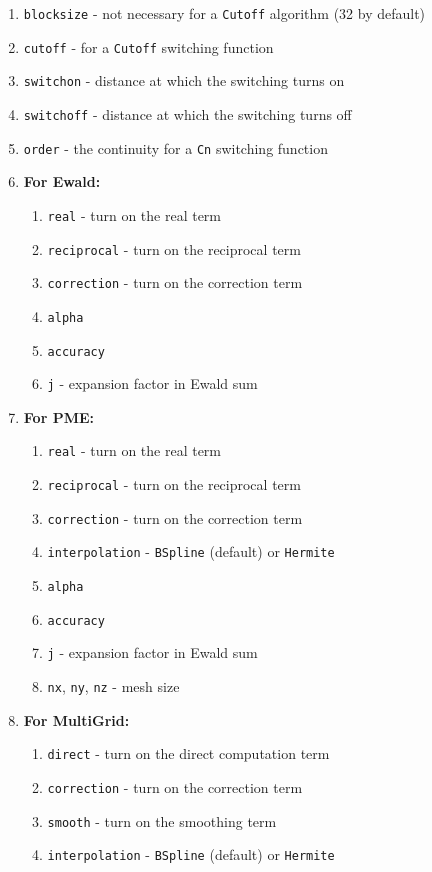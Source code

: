 \documentclass[11pt]{report}
\begin{document}
\begin{enumerate}
\item \texttt{blocksize} - not necessary for a \texttt{Cutoff} algorithm (32 by default)
\item \texttt{cutoff} - for a \texttt{Cutoff} switching function
\item \texttt{switchon} - distance at which the switching turns on
\item \texttt{switchoff} - distance at which the switching turns off
\item \texttt{order} - the continuity for a \texttt{Cn} switching function
\item {\bf For Ewald:}
\begin{enumerate}
\item \texttt{real} - turn on the real term
\item \texttt{reciprocal} - turn on the reciprocal term
\item \texttt{correction} - turn on the correction term
\item \texttt{alpha}
\item \texttt{accuracy}
\item \texttt{j} - expansion factor in Ewald sum
\end{enumerate}
\item {\bf For PME:}
\begin{enumerate}
\item \texttt{real} - turn on the real term
\item \texttt{reciprocal} - turn on the reciprocal term
\item \texttt{correction} - turn on the correction term
\item \texttt{interpolation} - \texttt{BSpline} (default) or \texttt{Hermite}
\item \texttt{alpha}
\item \texttt{accuracy}
\item \texttt{j} - expansion factor in Ewald sum
\item \texttt{nx}, \texttt{ny}, \texttt{nz} - mesh size
\end{enumerate}
\item {\bf For MultiGrid:}
\begin{enumerate}
\item \texttt{direct} - turn on the direct computation term
\item \texttt{correction} - turn on the correction term
\item \texttt{smooth} - turn on the smoothing term
\item \texttt{interpolation} - \texttt{BSpline} (default) or \texttt{Hermite}

\end{enumerate}
\end{enumerate}
\end{document}

